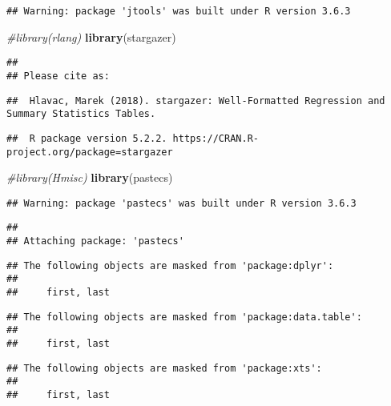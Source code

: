 \documentclass[
]{article}
\newenvironment{Shaded}{\begin{snugshade}}{\end{snugshade}}
\newcommand{\CommentTok}[1]{\textcolor[rgb]{0.56,0.35,0.01}{\textit{#1}}}
\newcommand{\KeywordTok}[1]{\textcolor[rgb]{0.13,0.29,0.53}{\textbf{#1}}}
\newcommand{\NormalTok}[1]{#1}
\begin{document}
\begin{verbatim}
## Warning: package 'jtools' was built under R version 3.6.3
\end{verbatim}

\begin{Shaded}
\begin{Highlighting}[]
\CommentTok{#library(rlang)}
\KeywordTok{library}\NormalTok{(stargazer)}
\end{Highlighting}
\end{Shaded}

\begin{verbatim}
## 
## Please cite as:
\end{verbatim}

\begin{verbatim}
##  Hlavac, Marek (2018). stargazer: Well-Formatted Regression and Summary Statistics Tables.
\end{verbatim}

\begin{verbatim}
##  R package version 5.2.2. https://CRAN.R-project.org/package=stargazer
\end{verbatim}

\begin{Shaded}
\begin{Highlighting}[]
\CommentTok{#library(Hmisc)}
\KeywordTok{library}\NormalTok{(pastecs)}
\end{Highlighting}
\end{Shaded}

\begin{verbatim}
## Warning: package 'pastecs' was built under R version 3.6.3
\end{verbatim}

\begin{verbatim}
## 
## Attaching package: 'pastecs'
\end{verbatim}

\begin{verbatim}
## The following objects are masked from 'package:dplyr':
## 
##     first, last
\end{verbatim}

\begin{verbatim}
## The following objects are masked from 'package:data.table':
## 
##     first, last
\end{verbatim}

\begin{verbatim}
## The following objects are masked from 'package:xts':
## 
##     first, last
\end{verbatim}
\end{document}
